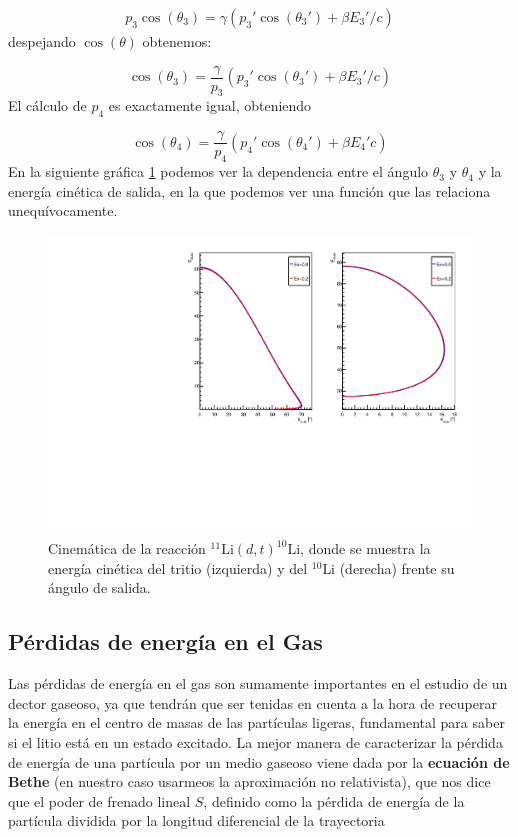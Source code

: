 \begin{eqnarray}
	p_3 \cos (\theta_3) = \gamma (p_3' \cos (\theta_3')+\beta E_3'/c)
\end{eqnarray}
despejando $\cos (\theta)$ obtenemos:

\begin{equation}
	\cos (\theta_3) = \frac{\gamma}{p_3} (p_3' \cos (\theta_3')+\beta E_3'/c)
\end{equation}
El cálculo de $p_4$ es exactamente igual, obteniendo


\begin{equation}
	\cos (\theta_4) = \frac{\gamma}{p_4} (p_4' \cos (\theta_4')+\beta E_4'c)
\end{equation}
En la siguiente gráfica \ref{Fig:04-Kin} podemos ver la dependencia entre el ángulo $\theta_3$ y $\theta_4$ y la energía cinética de salida, en la que podemos ver una función que las relaciona unequívocamente.

\begin{figure}[H] \centering
	\includegraphics[width=0.7\linewidth]{Imagenes/Cinematica.pdf}
	\caption{Cinemática de la reacción $^{11}\text{Li}(d,t)^{10}\text{Li}$, donde se muestra la energía cinética del tritio (izquierda) y del $^{10}$Li (derecha) frente su ángulo de salida.}

	\label{Fig:04-Kin}
\end{figure}


\subsection{Pérdidas de energía en el Gas}

Las pérdidas de energía en el gas son sumamente importantes en el estudio de un dector gaseoso, ya que tendrán que ser tenidas en cuenta a la hora de recuperar la energía en el centro de masas de las partículas ligeras, fundamental para saber si el litio está en un estado excitado. La mejor manera de caracterizar la pérdida de energía de una partícula por un medio gaseoso viene dada por la \textbf{ecuación de Bethe} (en nuestro caso usarmeos la aproximación no relativista), que nos dice que el poder de frenado lineal $S$, definido como la pérdida de energía de la partícula dividida por la longitud diferencial de la trayectoria  \cite{Knoll:1300754}


